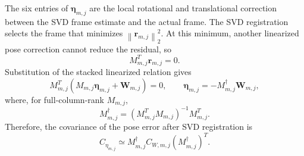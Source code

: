 \documentclass[11pt]{article}
\newcommand{\vct}[1]{\bm{#1}}
\newcommand{\norm}[1]{\left\|#1\right\|_2}
\begin{document}
The six entries of $\vct{\eta}_{m,j}$ are the local rotational and
translational correction between the SVD frame estimate and the actual frame.
The SVD registration selects the frame that minimizes
$\norm{\vct{r}_{m,j}}^2$.  At this minimum, another linearized pose correction
cannot reduce the residual, so
\begin{equation}
M_{m,j}^T\vct{r}_{m,j}=0.
\end{equation}
Substitution of the stacked linearized relation gives
\begin{equation}
M_{m,j}^T
\left(M_{m,j}\vct{\eta}_{m,j}+\vct{W}_{m,j}\right)=0,
\qquad
\vct{\eta}_{m,j}
=-M_{m,j}^{\dagger}\vct{W}_{m,j},
\end{equation}
where, for full-column-rank $M_{m,j}$,
\begin{equation}
M_{m,j}^{\dagger}
=
\left(M_{m,j}^TM_{m,j}\right)^{-1}M_{m,j}^T.
\end{equation}
Therefore, the covariance of the pose error after SVD registration is
\begin{equation}
\boxed{
C_{\eta_{m,j}}
\simeq
M_{m,j}^{\dagger}C_{W,m,j}(M_{m,j}^{\dagger})^T.}
\end{equation}
\end{document}
